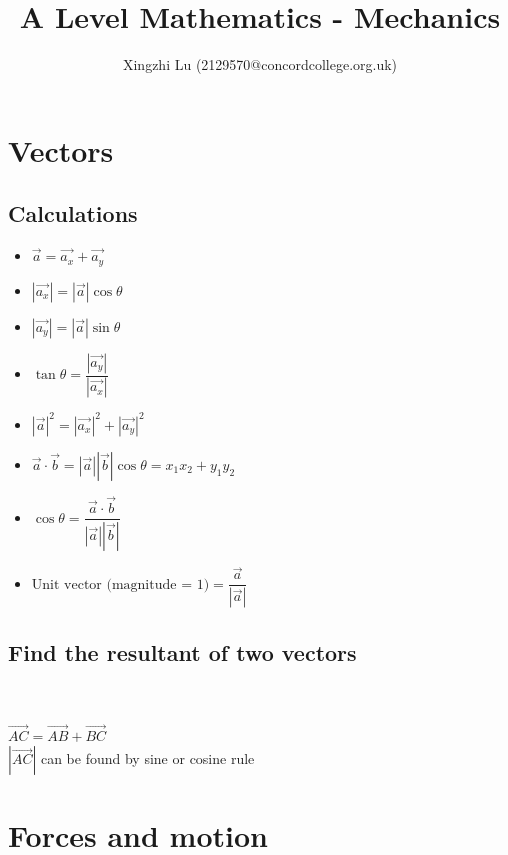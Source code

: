 \documentclass[A4paper]{article}
\title{A Level Mathematics - Mechanics}
\author{Xingzhi Lu (2129570@concordcollege.org.uk)}
\begin{document}
	\maketitle

	\section{Vectors}
	\subsection{Calculations}
	\begin{itemize}
		\item $\vec{a}=\vec{a_x}+\vec{a_y}$
		\item $|\vec{a_x}|=|\vec{a}|\cos\theta$
		\item $|\vec{a_y}|=|\vec{a}|\sin\theta$
		\item $\tan\theta = \dfrac{|\vec{a_y}|}{|\vec{a_x}|}$
		\item $|\vec{a}|^2=|\vec{a_x}|^2+|\vec{a_y}|^2$
		\item $\vec{a} \cdot \vec{b} = |\vec{a}||\vec{b}|\cos\theta = x_1x_2+y_1y_2$
		\item $\cos \theta = \dfrac{\vec{a} \cdot \vec{b}}{|\vec{a}||\vec{b}|}$
		\item $\text{Unit vector (magnitude = 1)} = \dfrac{\vec{a}}{|\vec{a}|}$

	\end{itemize}
	\subsection{Find the resultant of two vectors}
	\\
	\\
	$\overrightarrow{AC}=\overrightarrow{AB}+\overrightarrow{BC}$\\
	$|\overrightarrow{AC}|$ can be found by sine or cosine rule

	\section{Forces and motion}
	
\end{document}
